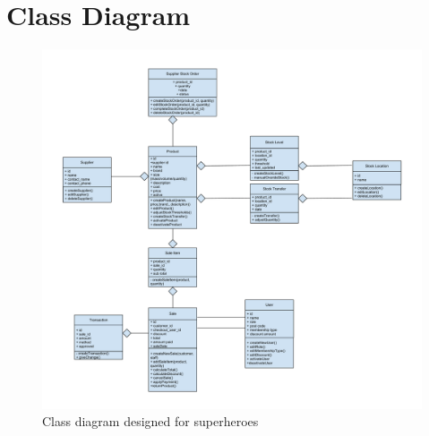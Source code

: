\documentclass[a4paper]{article}
\begin{document}
\section{Class Diagram}
\begin{figure}[h]
\centering
  \hspace*{-0.3in}
  \includegraphics[scale=0.3]{ClassDiagram.pdf}
	\caption{Class diagram designed for superheroes}
\end{figure}

\pagebreak
\end{document}
